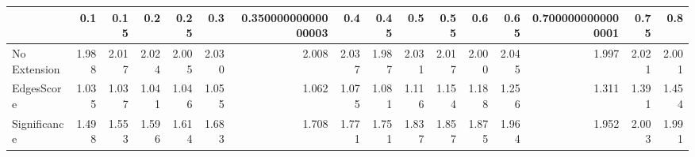 \begin{tabular}{lrrrrrrrrrrrrrrr}
\toprule
{} &   0.1 &  0.15 &   0.2 &  0.25 &   0.3 & 0.35000000000000003 &   0.4 &  0.45 &   0.5 &  0.55 &   0.6 &  0.65 & 0.7000000000000001 &  0.75 &   0.8 \\
\midrule
No Extension & 1.988 & 2.017 & 2.024 & 2.005 & 2.030 &               2.008 & 2.037 & 1.987 & 2.031 & 2.017 & 2.000 & 2.045 &              1.997 & 2.021 & 2.001 \\
EdgesScore   & 1.035 & 1.037 & 1.041 & 1.046 & 1.055 &               1.062 & 1.075 & 1.081 & 1.116 & 1.154 & 1.188 & 1.256 &              1.311 & 1.391 & 1.454 \\
Significance & 1.498 & 1.553 & 1.596 & 1.614 & 1.683 &               1.708 & 1.771 & 1.751 & 1.837 & 1.857 & 1.875 & 1.964 &              1.952 & 2.003 & 1.991 \\
\bottomrule
\end{tabular}
